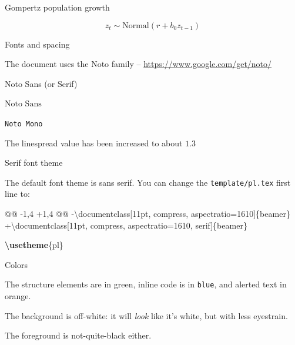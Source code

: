 \documentclass[11pt, compress, aspectratio=1610]{beamer}
\newenvironment{Shaded}{\begin{mdframed}}{\end{mdframed}}
\newcommand{\FunctionTok}[1]{\textcolor[HTML]{26A69A}{\textbf{{#1}}}}
\newcommand{\BuiltInTok}[1]{\textcolor[HTML]{42A5F5}{{#1}}}
\newcommand{\ExtensionTok}[1]{\textcolor[rgb]{0.74,0.68,0.62}{{#1}}}
\newcommand{\NormalTok}[1]{\textcolor[HTML]{212121}{{#1}}}
\providecommand{\tightlist}{%
  \setlength{\itemsep}{0pt}\setlength{\parskip}{0pt}}
\let\OldTexttt\texttt
\renewcommand{\texttt}[1]{\OldTexttt{\color{plTT}#1}}
\begin{document}
\begin{frame}{%
\protect\hypertarget{gompertz-population-growth}{%
Gompertz population growth}}

\[
z_{t} \sim \text{Normal}\left(r + b_0 z_{t-1}\right)
\]

\end{frame}

\begin{frame}[fragile]{%
\protect\hypertarget{fonts-and-spacing}{%
Fonts and spacing}}

The document uses the \alert{Noto} family –
\url{https://www.google.com/get/noto/}

\begin{description}
\tightlist
\item[Main body]
Noto Sans (or Serif)
\item[Maths]
\(\text{Noto Sans}\)
\item[Code]
\texttt{Noto\ Mono}
\end{description}

The linespread value has been increased to about \(1.3\)

\end{frame}

\begin{frame}[fragile]{%
\protect\hypertarget{serif-font-theme}{%
Serif font theme}}

The default font theme is sans serif. You can change the
\texttt{template/pl.tex} first line to:

\begin{Shaded}
\begin{Highlighting}[]
\NormalTok{@@ -1,4 +1,4 @@}
\NormalTok{-}\BuiltInTok{\textbackslash{}documentclass}\NormalTok{[11pt, compress, aspectratio=1610]\{}\ExtensionTok{beamer}\NormalTok{\}}
\NormalTok{+}\BuiltInTok{\textbackslash{}documentclass}\NormalTok{[11pt, compress, aspectratio=1610, serif]\{}\ExtensionTok{beamer}\NormalTok{\}}

\FunctionTok{\textbackslash{}usetheme}\NormalTok{\{pl\}}
\end{Highlighting}
\end{Shaded}

\end{frame}

\begin{frame}[fragile]{%
\protect\hypertarget{colors}{%
Colors}}

The structure elements are in green, inline code is in \texttt{blue},
and alerted text in \alert{orange}.

The background is off-white: it will \emph{look} like it’s white, but
with less eyestrain.

The foreground is not-quite-black either.

\end{frame}
\end{document}

